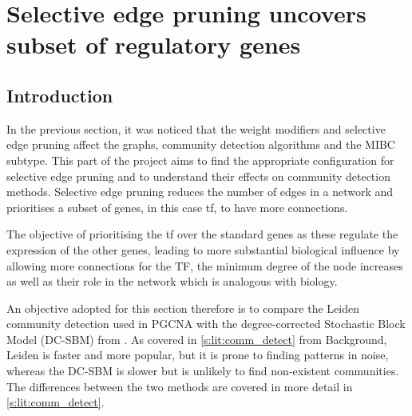 \chapter{Selective edge pruning uncovers subset of regulatory genes} \label{s:N_I:sel_pruning}
\vspace{3mm}
\vspace{3mm}

\section{Introduction}

In the previous section, it was noticed that the weight modifiers and selective edge pruning affect the graphs, community detection algorithms and the MIBC subtype. This part of the project aims to find the appropriate configuration for selective edge pruning and to understand their effects on community detection methods. Selective edge pruning reduces the number of edges in a network and prioritises a subset of genes, in this case \acrfull{tf}, to have more connections.

The objective of prioritising the \acrshort{tf} over the standard genes as these regulate the expression of the other genes, leading to more substantial biological influence by allowing more connections for the TF, the minimum degree of the node increases as well as their role in the network which is analogous with biology. 

An objective adopted for this section therefore is to compare the Leiden \citep{Traag2019-ne} community detection used in PGCNA with the degree-corrected Stochastic Block Model (DC-SBM) from \citep{Karrer2011-si, Peixoto2017-gc}. As covered in \cref{s:lit:comm_detect} from Background, Leiden is faster and more popular, but it is prone to finding patterns in noise, whereas the DC-SBM is slower but is unlikely to find non-existent communities. The differences between the two methods are covered in more detail in \cref{s:lit:comm_detect}.


